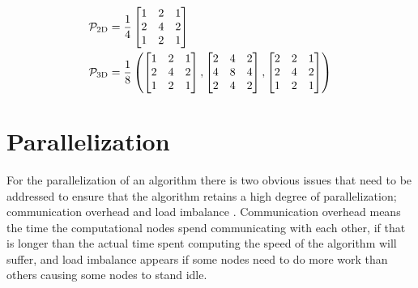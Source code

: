                     \begin{equation}
                        \centering
                        \begin{aligned}
                            \mathcal{P}_{2\text{D}} &= \frac{1}{4}
                            \begin{bmatrix}
                                1 & 2 & 1
                                \\
                                2 & 4 & 2
                                \\
                                1 & 2 & 1
                            \end{bmatrix}
                            \\
                            \mathcal{P}_{3\text{D}} &= \frac{1}{8} \left(
                            \begin{bmatrix}
                                1 & 2 & 1
                                \\
                                2 & 4 & 2
                                \\
                                1 & 2 & 1
                            \end{bmatrix}
                            ,
                            \begin{bmatrix}
                                2 & 4 & 2
                                \\
                                4 & 8 & 4
                                \\
                                2 & 4 & 2
                            \end{bmatrix}
                            ,
                            \begin{bmatrix}
                                2 & 2 & 1
                                \\
                                2 & 4 & 2
                                \\
                                1 & 2 & 1
                            \end{bmatrix}
                            \right)
                            \label{eq:prolongation_stencils}
                        \end{aligned}
                    \end{equation}

\section{Parallelization}
	For the parallelization of an algorithm there is two obvious issues that need
	to be addressed to ensure that the algorithm retains a high degree of parallelization;
	communication overhead and load imbalance \citep{hackbusch_multigrid_1982}.
  Communication overhead means the time the computational nodes spend communicating
  with each other, if that is longer than the actual time spent computing the speed
  of the algorithm will suffer, and load imbalance appears if some nodes need to
  do more work than others causing some nodes to stand idle.

